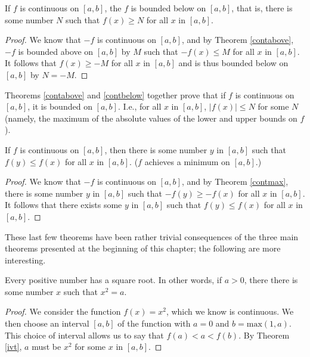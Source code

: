 \begin{theorem} \label{contbelow}
If $f$ is continuous on $[a, b]$, the $f$ is bounded below on $[a, b]$, that is, there is some number $N$ such that $f(x) \ge N$ for all $x$ in $[a, b]$.

\begin{proof}
We know that $-f$ is continuous on $[a, b]$, and by Theorem \ref{contabove}, $-f$ is bounded above on $[a, b]$ by $M$ such that $-f(x) \le M$ for all $x$ in $[a, b]$. It follows that $f(x) \ge -M$ for all $x$ in $[a, b]$ and is thus bounded below on $[a, b]$ by $N = -M$.
\end{proof}

\begin{remark}
Theorems \ref{contabove} and \ref{contbelow} together prove that if $f$ is continuous on $[a, b]$, it is bounded on $[a, b]$. I.e., for all $x$ in $[a, b]$, $|f(x)| \le N$ for some $N$ (namely, the maximum of the absolute values of the lower and upper bounds on $f$).
\end{remark}
\end{theorem}

\begin{theorem} \label{contmin}
If $f$ is continuous on $[a, b]$, then there is some number $y$ in $[a, b]$ such that $f(y) \le f(x)$ for all $x$ in $[a, b]$. ($f$ achieves a minimum on $[a, b]$.)

\begin{proof}
We know that $-f$ is continuous on $[a, b]$, and by Theorem \ref{contmax}, there is some number $y$ in $[a, b]$ such that $-f(y) \ge -f(x)$ for all $x$ in $[a, b]$. It follows that there exists some $y$ in $[a, b]$ such that $f(y) \le f(x)$ for all $x$ in $[a, b]$.
\end{proof}
\end{theorem}

These last few theorems have been rather trivial consequences of the three main theorems presented at the beginning of this chapter; the following are more interesting.

\begin{theorem} \label{sqrroot}
Every positive number has a square root. In other words, if $a > 0$, there there is some number $x$ such that $x^2 = a$.

\begin{proof}
We consider the function $f(x) = x^2$, which we know is continuous. We then choose an interval $[a, b]$ of the function with $a = 0$ and $b = \textrm{max}(1, a)$. This choice of interval allows us to say that $f(a) < a < f(b)$. By Theorem \ref{ivt}, $a$ must be $x^2$ for some $x$ in $[a, b]$.
\end{proof}
\end{theorem}

